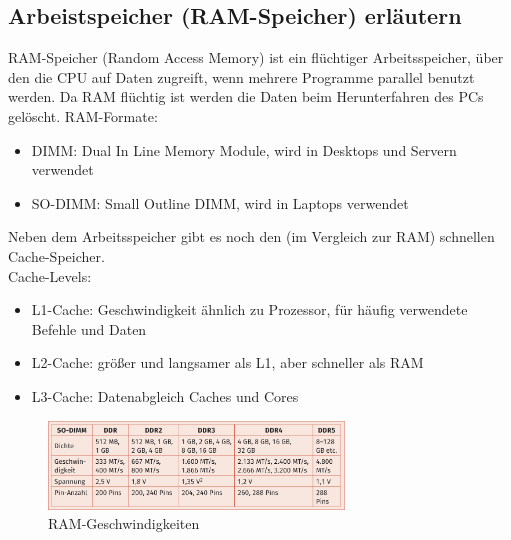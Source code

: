 \subsection{Arbeistspeicher (RAM-Speicher) erläutern}
    \begin{subindent}
        RAM-Speicher (Random Access Memory) ist ein flüchtiger Arbeitsspeicher, über den die CPU auf Daten zugreift, wenn mehrere Programme parallel benutzt werden. Da RAM flüchtig ist werden die Daten beim Herunterfahren des PCs gelöscht.
        RAM-Formate:
        \begin{itemize}[itemsep=0.1em, parsep=0.3em]
            \item DIMM\@: Dual In Line Memory Module, wird in Desktops und Servern verwendet
            \item SO-DIMM\@: Small Outline DIMM, wird in Laptops verwendet
        \end{itemize}
        Neben dem Arbeitsspeicher gibt es noch den (im Vergleich zur RAM) schnellen Cache-Speicher. \\
        Cache-Levels:
        \begin{itemize}[itemsep=0.1em, parsep=0.3em]
            \item L1-Cache: Geschwindigkeit ähnlich zu Prozessor, für häufig verwendete Befehle und Daten
            \item L2-Cache: größer und langsamer als L1, aber schneller als RAM
            \item L3-Cache: Datenabgleich Caches und Cores
        \end{itemize}
    \end{subindent}

    \begin{figure}[ht]
        \centering
        \includegraphics[width=0.7\textwidth]{./images/2.4.4_ramspeeds.png}
        \caption{RAM-Geschwindigkeiten}\label{fig:RAM-Geschwindigkeiten}
    \end{figure}

